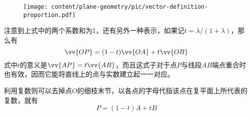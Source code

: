 \begin{figure}[htbp]
\centering
\texttt{[image: content/plane-geometry/pic/vector-definition-proportion.pdf]}
\caption{}
\label{fig:vector-definition-proportion}
\end{figure}

注意到上式中的两个系数和为1，还有另外一种表示，如果记$t= \lambda / (1+\lambda)$，那么有
\begin{equation}
  \label{eq:vector-definition-proportion-t}
  \vv{OP} = (1-t) \vv{OA} + t \vv{OB}
\end{equation}
式中$t$的意义是$\vv{AP} = t \vv{AB}$，而且这式子对于点$P$与线段$AB$端点重合时也有效，因而它能将直线上的点与实数建立起一一对应。

利用复数则可以去掉点$O$的细枝末节，以各点的字母代指该点在复平面上所代表的复数，就有
\begin{equation}
  \label{eq:complex-definition-proportion}
  P = (1-t)A + tB
\end{equation}

